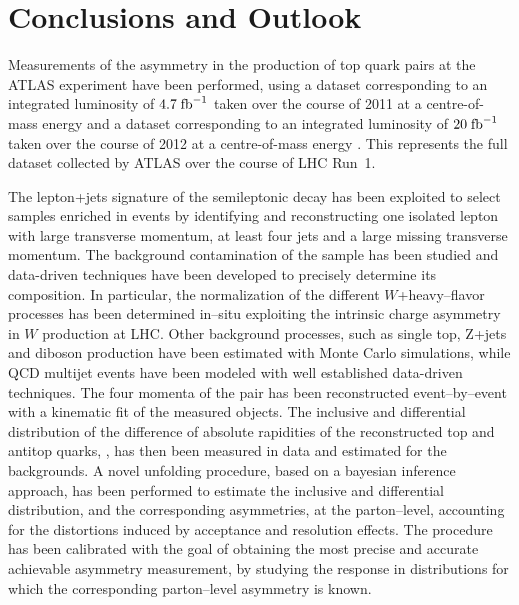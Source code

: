\chapter{Conclusions and Outlook}
\label{sec:conclusion}

Measurements of the asymmetry in the production of top quark pairs at
the ATLAS experiment have been performed, using a dataset
corresponding to an integrated luminosity of $4.7 \; \mathrm{fb}^{-1}{}$ taken over
the course of 2011 at a centre-of-mass energy \seventev{} and a
dataset corresponding to an integrated luminosity of $20 \; \mathrm{fb}^{-1}{}$
taken over the course of 2012 at a centre-of-mass energy \eighttev{}.
This represents the full dataset collected by ATLAS over the course of
LHC \mbox{Run 1}.

The lepton+jets signature of the semileptonic \ttbar{} decay has been
exploited to select samples enriched in \ttbar{} events by identifying
and reconstructing one isolated lepton with large transverse momentum,
at least four jets and a large missing transverse momentum.
The background contamination of the sample has been studied and
data-driven techniques have been developed to precisely determine its
composition. In particular, the normalization of the different
$W$+heavy--flavor processes has been determined in--situ exploiting
the intrinsic charge asymmetry in $W$ production at LHC. 
Other background processes, such
as single top, Z+jets and diboson production have been estimated with
Monte Carlo simulations, while QCD multijet events have been modeled
with well established data-driven techniques.
The four momenta of the \ttbar{} pair has been reconstructed
event--by--event with a kinematic fit of the measured objects. The
inclusive and differential distribution of the difference of absolute
rapidities of the reconstructed top and antitop quarks, \dy{}, has then been
measured in data and estimated for the backgrounds.
A novel unfolding procedure, based on a bayesian inference approach, has
been performed to estimate the inclusive and differential \dy{}
distribution, and the corresponding asymmetries, at the parton--level,
accounting for the distortions induced by acceptance and
resolution effects.
The procedure has been calibrated with the goal of obtaining the most
precise and accurate achievable asymmetry measurement, by studying the
response in distributions for which the corresponding parton--level
asymmetry is known.

